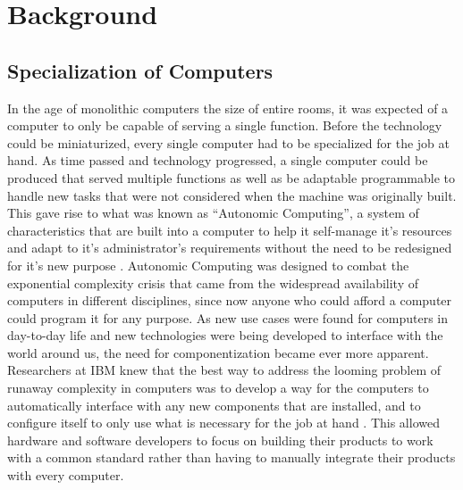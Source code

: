 \chapter{Background} %

\label{Chapter2} %


\section{Specialization of Computers}
In the age of monolithic computers the size of entire rooms, it was expected of a computer to only be capable of serving a single function.
Before the technology could be miniaturized, every single computer had to be specialized for the job at hand.
As time passed and technology progressed, a single computer could be produced that served multiple functions as well as be adaptable programmable to handle new tasks that were not considered when the machine was originally built.
This gave rise to what was known as \enquote{Autonomic Computing}, a system of characteristics that are built into a computer to help it self-manage it's resources and adapt to it's administrator's requirements without the need to be redesigned for it's new purpose \citep{AutonomicComputing}.
Autonomic Computing was designed to combat the exponential complexity crisis that came from the widespread availability of computers in different disciplines, since now anyone who could afford a computer could program it for any purpose.
As new use cases were found for computers in day-to-day life and new technologies were being developed to interface with the world around us, the need for componentization became ever more apparent.
Researchers at IBM knew that the best way to address the looming problem of runaway complexity in computers was to develop a way for the computers to automatically interface with any new components that are installed, and to configure itself to only use what is necessary for the job at hand \citep[p.~43]{AutonomicComputing}.
This allowed hardware and software developers to focus on building their products to work with a common standard rather than having to manually integrate their products with every computer.

